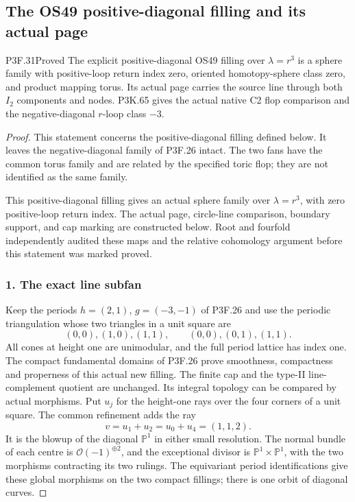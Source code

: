 \subsection{The OS49 positive-diagonal filling and its actual page}
\begin{statement}{P3F.31}{Proved}
The explicit positive-diagonal OS49 filling over $\lambda=r^3$ is a sphere family with positive-loop return index zero, oriented homotopy-sphere class zero, and product mapping torus. Its actual page carries the source line through both $I_2$ components and nodes. P3K.65 gives the actual native C2 flop comparison and the negative-diagonal \(r\)-loop class \(-3\).
\end{statement}
\begin{proof}
This statement concerns the positive-diagonal filling defined below. It leaves the negative-diagonal family of P3F.26 intact. The two fans have the common torus family and are related by the specified toric flop; they are not identified as the same family.

This positive-diagonal filling gives an actual sphere family over \(\lambda=r^3\), with zero positive-loop return index. The actual page, circle-line comparison, boundary support, and cap marking are constructed below. Root and fourfold independently audited these maps and the relative cohomology argument before this statement was marked proved.

\subsubsection{1. The exact line subfan}\label{the-exact-line-subfan}

Keep the periods \(h=(2,1)\), \(g=(-3,-1)\) of P3F.26 and use the periodic triangulation whose two triangles in a unit square are \[
 (0,0),(1,0),(1,1),\qquad (0,0),(0,1),(1,1).          \tag{P3F.31.1}
\] All cones at height one are unimodular, and the full period lattice has index one. The compact fundamental domains of P3F.26 prove smoothness, compactness and properness of this actual new filling. The finite cap and the type-II line-complement quotient are unchanged. Its integral topology can be compared by actual morphisms. Put \(u_j\) for the height-one rays over the four corners of a unit square. The common refinement adds the ray \[
 v=u_1+u_2=u_0+u_4=(1,1,2).
\] It is the blowup of the diagonal \(\mathbb P^1\) in either small resolution. The normal bundle of each centre is \(\mathcal O(-1)^{\oplus2}\), and the exceptional divisor is \(\mathbb P^1\times\mathbb P^1\), with the two morphisms contracting its two rulings. The equivariant period identifications give these global morphisms on the two compact fillings; there is one orbit of diagonal curves.


\end{proof}
